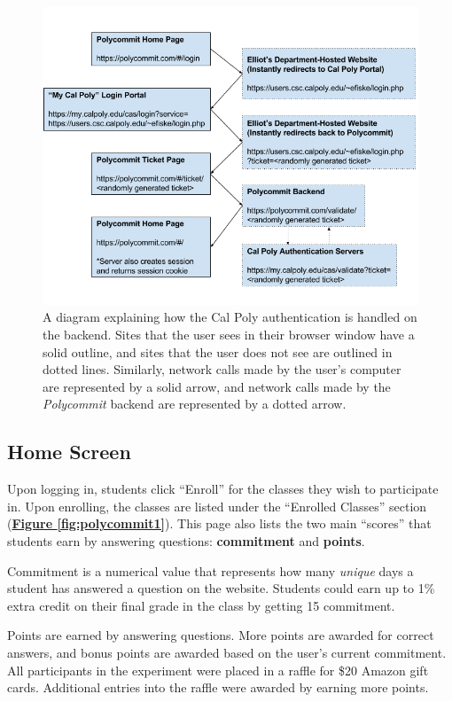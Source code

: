 \begin{figure}[h]
	\includegraphics[width=1.0\linewidth]{figures/logindiagram}
	\caption{A diagram explaining how the Cal Poly authentication is handled on the backend. Sites that the user sees in their browser window have a solid outline, and sites that the user does not see are outlined in dotted lines. Similarly, network calls made by the user's computer are represented by a solid arrow, and network calls made by the \textit{Polycommit} backend are represented by a dotted arrow.}
	\label{fig:logindiagram}
\end{figure}


\subsection{Home Screen}
\par Upon logging in, students click ``Enroll'' for the classes they wish to participate in. Upon enrolling, the classes are listed under the ``Enrolled Classes'' section (\textbf{\hyperref[fig:polycommit1]{Figure \ref*{fig:polycommit1}}}). This page also lists the two main ``scores'' that students earn by answering questions: \textbf{commitment} and \textbf{points}.

\par Commitment is a numerical value that represents how many \textit{unique} days a student has answered a question on the website. Students could earn up to 1\% extra credit on their final grade in the class by getting 15 commitment.

\par Points are earned by answering questions. More points are awarded for correct answers, and bonus points are awarded based on the user's current commitment. All participants in the experiment were placed in a raffle for \$20 Amazon gift cards. Additional entries into the raffle were awarded by earning more points.

